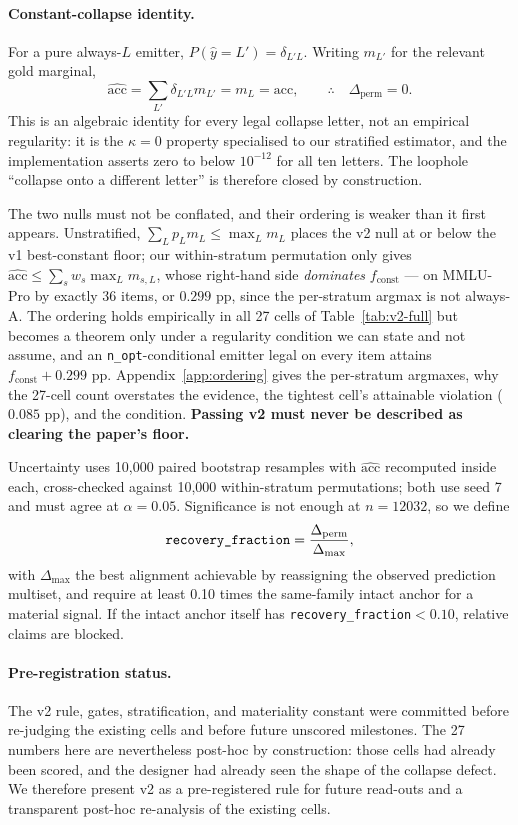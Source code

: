 \paragraph{Constant-collapse identity.}
For a pure always-$L$ emitter, $P(\hat{y}=L')=\delta_{L'L}$. Writing $m_{L'}$ for the relevant gold marginal,
\begin{equation}
\widehat{\mathrm{acc}}
=\sum_{L'}\delta_{L'L}m_{L'}
=m_{L}
=\mathrm{acc},
\qquad
\therefore\quad \Delta_{\mathrm{perm}}=0.
\end{equation}
This is an algebraic identity for every legal collapse letter, not an empirical regularity: it is the $\kappa=0$ property specialised to our stratified estimator, and the implementation asserts zero to below $10^{-12}$ for all ten letters. The loophole ``collapse onto a different letter'' is therefore closed by construction.

The two nulls must not be conflated, and their ordering is weaker than it first appears. Unstratified, $\sum_L p_{L}m_{L}\leq\max_Lm_{L}$ places the v2 null at or below the v1 best-constant floor; our within-stratum permutation only gives $\widehat{\mathrm{acc}}\leq\sum_s w_s\max_L m_{s,L}$, whose right-hand side \emph{dominates} $f_{\mathrm{const}}$ --- on MMLU-Pro by exactly $36$ items, or $0.299$ pp, since the per-stratum argmax is not always-A. The ordering holds empirically in all 27 cells of Table~\ref{tab:v2-full} but becomes a theorem only under a regularity condition we can state and not assume, and an \texttt{n\_opt}-conditional emitter legal on every item attains $f_{\mathrm{const}}+0.299$ pp. Appendix~\ref{app:ordering} gives the per-stratum argmaxes, why the 27-cell count overstates the evidence, the tightest cell's attainable violation ($0.085$ pp), and the condition. \textbf{Passing v2 must never be described as clearing the paper's floor.}

Uncertainty uses 10,000 paired bootstrap resamples with $\widehat{\mathrm{acc}}$ recomputed inside each, cross-checked against 10,000 within-stratum permutations; both use seed 7 and must agree at $\alpha=0.05$. Significance is not enough at $n=12032$, so we define
\begin{equation}
\text{\texttt{recovery\_fraction}}=\frac{\Delta_{\mathrm{perm}}}{\Delta_{\max}},
\end{equation}
with $\Delta_{\max}$ the best alignment achievable by reassigning the observed prediction multiset, and require at least 0.10 times the same-family intact anchor for a material signal. If the intact anchor itself has \texttt{recovery\_fraction}$<0.10$, relative claims are blocked.

\paragraph{Pre-registration status.}
The v2 rule, gates, stratification, and materiality constant were committed before re-judging the existing cells and before future unscored milestones. The 27 numbers here are nevertheless post-hoc by construction: those cells had already been scored, and the designer had already seen the shape of the collapse defect. We therefore present v2 as a pre-registered rule for future read-outs and a transparent post-hoc re-analysis of the existing cells.
